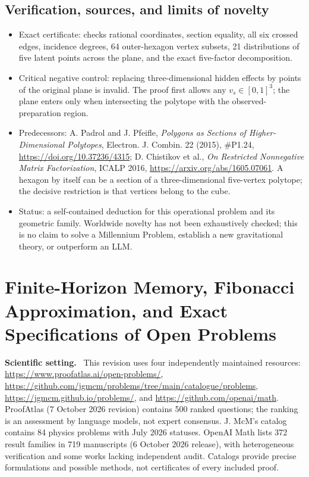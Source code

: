 \documentclass[11pt,a4paper,oneside]{book}
\newcommand{\note}[1]{\par\medskip\noindent\textbf{#1}\ }
\begin{document}
\section{Verification, sources, and limits of novelty}
\begin{itemize}
\item Exact certificate:  checks rational coordinates, section equality, all six crossed edges, incidence degrees, 64 outer-hexagon vertex subsets, 21 distributions of five latent points across the plane, and the exact five-factor decomposition.
\item Critical negative control: replacing three-dimensional hidden effects by points of the original plane is invalid. The proof first allows any $v_s\in[0,1]^3$; the plane enters only when intersecting the polytope with the observed-preparation region.
\item Predecessors: A. Padrol and J. Pfeifle, \emph{Polygons as Sections of Higher-Dimensional Polytopes}, Electron. J. Combin. 22 (2015), \#P1.24, \url{https://doi.org/10.37236/4315}; D. Chistikov et al., \emph{On Restricted Nonnegative Matrix Factorization}, ICALP 2016, \url{https://arxiv.org/abs/1605.07061}. A hexagon by itself can be a section of a three-dimensional five-vertex polytope; the decisive restriction is that vertices belong to the cube.
\item Status: a self-contained deduction for this operational problem and its geometric family. Worldwide novelty has not been exhaustively checked; this is no claim to solve a Millennium Problem, establish a new gravitational theory, or outperform an LLM.
\end{itemize}

\chapter{Finite-Horizon Memory, Fibonacci Approximation, and Exact Specifications of Open Problems}
\note{Scientific setting.} This revision uses four independently maintained resources: \url{https://www.proofatlas.ai/open-problems/}, \url{https://github.com/jgmcm/problems/tree/main/catalogue/problems}, \url{https://jgmcm.github.io/problems/}, and \url{https://github.com/openai/math}. ProofAtlas (7 October 2026 revision) contains 500 ranked questions; the ranking is an assessment by language models, not expert consensus. J. McM's catalog contains 84 physics problems with July 2026 statuses. OpenAI Math lists 372 result families in 719 manuscripts (6 October 2026 release), with heterogeneous verification and some works lacking independent audit. Catalogs provide precise formulations and possible methods, not certificates of every included proof.
\end{document}
